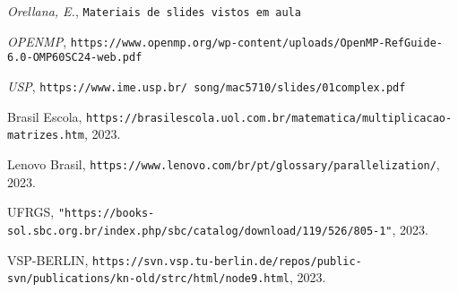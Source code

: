 \documentclass[12pt, a4paper]{article}
\begin{document}
	\begin{thebibliography}{9}
		 \textit{Orellana, E.}, \texttt{Materiais de slides vistos em aula}

		 \textit{OPENMP}, \texttt{https://www.openmp.org/wp-content/uploads/OpenMP-RefGuide-6.0-OMP60SC24-web.pdf}

		 \textit{USP}, \texttt{https://www.ime.usp.br/~song/mac5710/slides/01complex.pdf}

		 Brasil Escola, \texttt{https://brasilescola.uol.com.br/matematica/multiplicacao-matrizes.htm}, 2023.

		 Lenovo Brasil, \texttt{https://www.lenovo.com/br/pt/glossary/parallelization/}, 2023.

		 UFRGS, \texttt{"https://books-sol.sbc.org.br/index.php/sbc/catalog/download/119/526/805-1"}, 2023.

		 VSP-BERLIN, \texttt{https://svn.vsp.tu-berlin.de/repos/public-svn/publications/kn-old/strc/html/node9.html}, 2023.
	\end{thebibliography}
\end{document}
